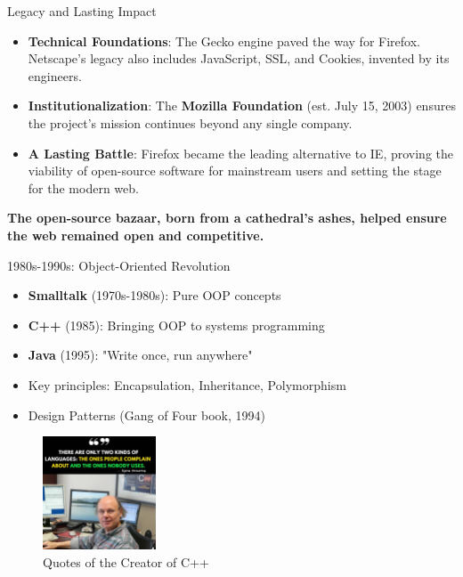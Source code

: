 \documentclass{beamer}
\begin{document}
\begin{frame}[t]{Legacy and Lasting Impact}
\begin{itemize}
    \item \textbf{Technical Foundations}: The Gecko engine paved the way for Firefox. Netscape's legacy also includes JavaScript, SSL, and Cookies, invented by its engineers.
    \item \textbf{Institutionalization}: The \textbf{Mozilla Foundation} (est. July 15, 2003) ensures the project's mission continues beyond any single company.
    \item \textbf{A Lasting Battle}: Firefox became the leading alternative to IE, proving the viability of open-source software for mainstream users and setting the stage for the modern web.
\end{itemize}

\begin{center}
    \textbf{The open-source bazaar, born from a cathedral's ashes, helped ensure the web remained open and competitive.}
\end{center}
\end{frame}

\begin{frame}[t]{1980s-1990s: Object-Oriented Revolution}
\begin{itemize}
    \item \textbf{Smalltalk} (1970s-1980s): Pure OOP concepts
    \item \textbf{C++} (1985): Bringing OOP to systems programming
    \item \textbf{Java} (1995): "Write once, run anywhere"
    \item Key principles: Encapsulation, Inheritance, Polymorphism
    \item Design Patterns (Gang of Four book, 1994)
\end{itemize}

\begin{figure}
    \includegraphics[width=0.3\textwidth]{images/cpp.jpeg}
    \caption{Quotes of the Creator of C++}
\end{figure}

\end{frame}
\end{document}
